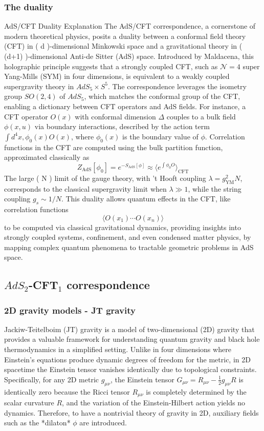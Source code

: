 \subsubsection{The duality}

AdS/CFT Duality Explanation
The AdS/CFT correspondence, a cornerstone of modern theoretical physics, posits a duality between a conformal field theory (CFT) in ( d )-dimensional Minkowski space and a gravitational theory in ( (d+1) )-dimensional Anti-de Sitter (AdS) space. Introduced by Maldacena, this holographic principle suggests that a strongly coupled CFT, such as \( \mathcal{N}=4 \) super Yang-Mills (SYM) in four dimensions, is equivalent to a weakly coupled supergravity theory in \( AdS_5 \times S^5 \). The correspondence leverages the isometry group \( SO(2,4) \) of \( AdS_5 \), which matches the conformal group of the CFT, enabling a dictionary between CFT operators and AdS fields. For instance, a CFT operator \( O(x) \) with conformal dimension \( \Delta \) couples to a bulk field \( \phi(x, u) \) via boundary interactions, described by the action term \( \int d^4 x , \phi_0(x) O(x) \), where \( \phi_0(x) \) is the boundary value of \( \phi \). Correlation functions in the CFT are computed using the bulk partition function, approximated classically as \[Z_{\text{AdS}}[\phi_0] = e^{-S_{\text{AdS}}[\phi]} \approx \langle e^{\int \phi_0 O} \rangle_{\text{CFT}}\] The large ( N ) limit of the gauge theory, with ’t Hooft coupling \( \lambda = g_{\text{YM}}^2 N \), corresponds to the classical supergravity limit when \( \lambda \gg 1 \), while the string coupling \( g_s \sim 1/N \). This duality allows quantum effects in the CFT, like correlation functions \[\langle O(x_1) \cdots O(x_n) \rangle\] to be computed via classical gravitational dynamics, providing insights into strongly coupled systems, confinement, and even condensed matter physics, by mapping complex quantum phenomena to tractable geometric problems in AdS space.

\subsection{$AdS_2$-CFT$_1$ correspondence}

\subsubsection{2D gravity models - JT gravity}
Jackiw-Teitelboim (JT) gravity is a model of two-dimensional (2D) gravity that provides a valuable framework for understanding quantum gravity and black hole thermodynamics in a simplified setting. Unlike in four dimensions where Einstein's equations produce dynamic degrees of freedom for the metric, in 2D spacetime the Einstein tensor vanishes identically due to topological constraints. Specifically, for any 2D metric $g_{\mu\nu}$, the Einstein tensor $G_{\mu\nu} = R_{\mu\nu} - \frac{1}{2}g_{\mu\nu}R$ is identically zero because the Ricci tensor $R_{\mu\nu}$ is completely determined by the scalar curvature $R$, and the variation of the Einstein-Hilbert action yields no dynamics. Therefore, to have a nontrivial theory of gravity in 2D, auxiliary fields such as the *dilaton* $\phi$ are introduced.

